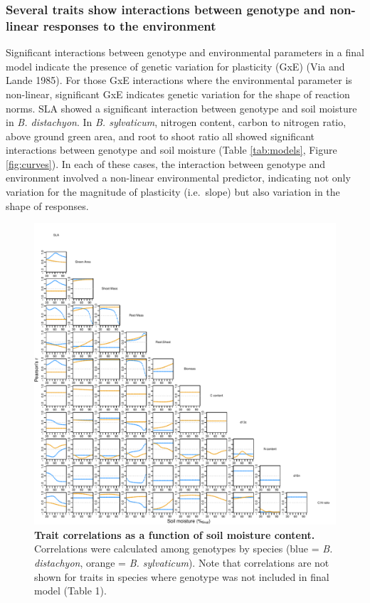 \documentclass[jou,floatsintext]{apa6}
\begin{document}
\hypertarget{several-traits-show-interactions-between-genotype-and-non-linear-responses-to-the-environment}{%
\subsubsection{Several traits show interactions between genotype and non-linear responses to the environment}\label{several-traits-show-interactions-between-genotype-and-non-linear-responses-to-the-environment}}

Significant interactions between genotype and environmental parameters in a final model indicate the presence of genetic variation for plasticity (GxE) (Via and Lande 1985). For those GxE interactions where the environmental parameter is non-linear, significant GxE indicates genetic variation for the shape of reaction norms. SLA showed a significant interaction between genotype and soil moisture in \emph{B. distachyon}. In \emph{B. sylvaticum}, nitrogen content, carbon to nitrogen ratio, above ground green area, and root to shoot ratio all showed significant interactions between genotype and soil moisture (Table \ref{tab:models}, Figure \ref{fig:curves}). In each of these cases, the interaction between genotype and environment involved a non-linear environmental predictor, indicating not only variation for the magnitude of plasticity (i.e.~slope) but also variation in the shape of responses.



\begin{figure}[!h]
\includegraphics[width=\textwidth]{../Figures/corsplots_byspecies} \caption{\textbf{Trait correlations as a function of soil moisture content.} Correlations were calculated among genotypes by species (blue = \emph{B. distachyon}, orange = \emph{B. sylvaticum}). Note that correlations are not shown for traits in species where genotype was not included in final model (Table 1).}\label{fig:cors}
\end{figure}
\end{document}
